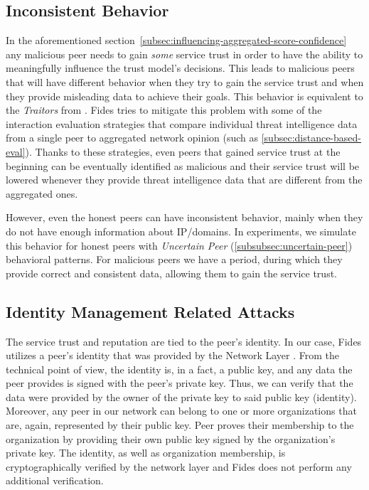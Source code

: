 \subsection{Inconsistent Behavior}
\label{subsec:inconsistent-behavior}
In the aforementioned section~\ref{subsec:influencing-aggregated-score-confidence} any malicious peer needs to gain \textit{some} service trust in order to have the ability to meaningfully influence the trust model's decisions.
This leads to malicious peers that will have different behavior when they try to gain the service trust and when they provide misleading data to achieve their goals.
This behavior is equivalent to the \textit{Traitors} from \cite{KOUTROULI201247}.
Fides tries to mitigate this problem with some of the interaction evaluation strategies that compare individual threat intelligence data from a single peer to aggregated network opinion (such as \ref{subsec:distance-based-eval}).
Thanks to these strategies, even peers that gained service trust at the beginning can be eventually identified as malicious and their service trust will be lowered whenever they provide threat intelligence data that are different from the aggregated ones.

However, even the honest peers can have inconsistent behavior, mainly when they do not have enough information about IP/domains.
In experiments, we simulate this behavior for honest peers with \textit{Uncertain Peer} (\ref{subsubsec:uncertain-peer}) behavioral patterns.
For malicious peers we have a period, during which they provide correct and consistent data, allowing them to gain the service trust. 

\subsection{Identity Management Related Attacks}
\label{subsec:identity-management-attacks}
The service trust and reputation are tied to the peer's identity. 
In our case, Fides utilizes a peer's identity that was provided by the Network Layer \cite{nl}.
From the technical point of view, the identity is, in a fact, a public key, and any data the peer provides is signed with the peer's private key. Thus, we can verify that the data were provided by the owner of the private key to said public key (identity).
Moreover, any peer in our network can belong to one or more organizations that are, again, represented by their public key. 
Peer proves their membership to the organization by providing their own public key signed by the organization's private key.
The identity, as well as organization membership, is cryptographically verified by the network layer \cite{nl} and Fides does not perform any additional verification. 

